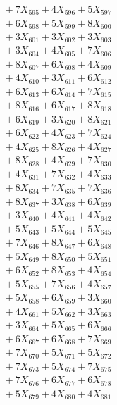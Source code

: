\documentclass[a4paper,10pt]{article}
\begin{document}
{\begin{align}
&\;  + 7 X_{595} + 4 X_{596} + 5 X_{597} \\[0.3ex]
&\;  + 6 X_{598} + 5 X_{599} + 8 X_{600} \\[0.3ex]
&\;  + 3 X_{601} + 3 X_{602} + 3 X_{603} \\[0.3ex]
&\;  + 3 X_{604} + 4 X_{605} + 7 X_{606} \\[0.3ex]
&\;  + 8 X_{607} + 6 X_{608} + 4 X_{609} \\[0.5ex]\allowbreak
&\;  + 4 X_{610} + 3 X_{611} + 6 X_{612} \\[0.3ex]
&\;  + 6 X_{613} + 6 X_{614} + 7 X_{615} \\[0.3ex]
&\;  + 8 X_{616} + 6 X_{617} + 8 X_{618} \\[0.3ex]
&\;  + 6 X_{619} + 3 X_{620} + 8 X_{621} \\[0.3ex]
&\;  + 6 X_{622} + 4 X_{623} + 7 X_{624} \\[0.3ex]
&\;  + 4 X_{625} + 8 X_{626} + 4 X_{627} \\[0.3ex]
&\;  + 8 X_{628} + 4 X_{629} + 7 X_{630} \\[0.3ex]
&\;  + 4 X_{631} + 7 X_{632} + 4 X_{633} \\[0.3ex]
&\;  + 8 X_{634} + 7 X_{635} + 7 X_{636} \\[0.3ex]
&\;  + 8 X_{637} + 3 X_{638} + 6 X_{639} \\[0.5ex]\allowbreak
&\;  + 3 X_{640} + 4 X_{641} + 4 X_{642} \\[0.3ex]
&\;  + 5 X_{643} + 5 X_{644} + 5 X_{645} \\[0.3ex]
&\;  + 7 X_{646} + 8 X_{647} + 6 X_{648} \\[0.3ex]
&\;  + 5 X_{649} + 8 X_{650} + 5 X_{651} \\[0.3ex]
&\;  + 6 X_{652} + 8 X_{653} + 4 X_{654} \\[0.3ex]
&\;  + 5 X_{655} + 7 X_{656} + 4 X_{657} \\[0.3ex]
&\;  + 5 X_{658} + 6 X_{659} + 3 X_{660} \\[0.3ex]
&\;  + 4 X_{661} + 5 X_{662} + 3 X_{663} \\[0.3ex]
&\;  + 3 X_{664} + 5 X_{665} + 6 X_{666} \\[0.3ex]
&\;  + 6 X_{667} + 6 X_{668} + 7 X_{669} \\[0.5ex]\allowbreak
&\;  + 7 X_{670} + 5 X_{671} + 5 X_{672} \\[0.3ex]
&\;  + 7 X_{673} + 5 X_{674} + 7 X_{675} \\[0.3ex]
&\;  + 7 X_{676} + 6 X_{677} + 6 X_{678} \\[0.3ex]
&\;  + 5 X_{679} + 4 X_{680} + 4 X_{681} \\[0.3ex]

\end{align}}
\end{document}
